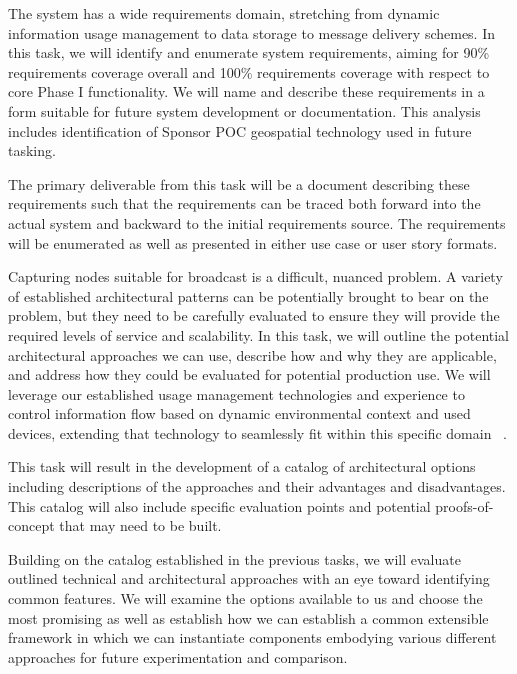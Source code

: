 \documentclass{sbir}
\begin{document}
The system has a wide requirements domain, stretching from dynamic information usage management to data storage to message delivery schemes. In this task, we will identify and enumerate system requirements, aiming for 90\% requirements coverage overall and 100\% requirements coverage with respect to core Phase I functionality. We will name and describe these requirements in a form suitable for future system development or documentation. This analysis includes identification of Sponsor POC geospatial technology used in future tasking.

The primary deliverable from this task will be a document describing these requirements such that the requirements can be traced both forward into the actual system and backward to the initial requirements source. The requirements will be enumerated as well as presented in either use case or user story formats.

Capturing nodes suitable for broadcast is a difficult, nuanced problem. A variety of established architectural patterns can be potentially brought to bear on the problem, but they need to be carefully evaluated to ensure they will provide the required levels of service and scalability. In this task, we will outline the potential architectural approaches we can use, describe how and why they are applicable, and address how they could be evaluated for potential production use. We will leverage our established usage management technologies and experience to control information flow based on dynamic environmental context and used devices, extending that technology to seamlessly fit within this specific domain ~\cite{JaLaHe:11,JaLaHe:12}.

This task will result in the development of a catalog of architectural options including descriptions of the approaches and their advantages and disadvantages. This catalog will also include specific evaluation points and potential proofs-of-concept that may need to be built.

Building on the catalog established in the previous tasks, we will evaluate outlined technical and architectural approaches with an eye toward identifying common features. We will examine the options available to us and choose the most promising as well as establish how we can establish a common extensible framework in which we can instantiate components embodying various different approaches for future experimentation and comparison.
\end{document}
